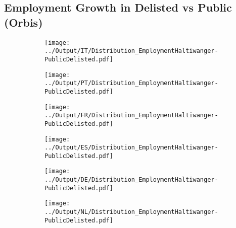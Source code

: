 \documentclass[12pt,notitlepage]{article}
\begin{document}
\subsection{Employment Growth in Delisted vs Public (Orbis)}
\begin{figure}[!htpb]
\centering
\begin{subfigure}{.49\textwidth}
    \centering
 \texttt{[image: ../Output/IT/Distribution\_EmploymentHaltiwanger-PublicDelisted.pdf]}
\end{subfigure}%
\begin{subfigure}{.49\textwidth}
    \centering
 \texttt{[image: ../Output/PT/Distribution\_EmploymentHaltiwanger-PublicDelisted.pdf]}
\end{subfigure}
\begin{subfigure}{.49\textwidth}
    \centering
 \texttt{[image: ../Output/FR/Distribution\_EmploymentHaltiwanger-PublicDelisted.pdf]}
\end{subfigure}%
\begin{subfigure}{.49\textwidth}
    \centering
 \texttt{[image: ../Output/ES/Distribution\_EmploymentHaltiwanger-PublicDelisted.pdf]}
\end{subfigure}
\begin{subfigure}{.49\textwidth}
    \centering
 \texttt{[image: ../Output/DE/Distribution\_EmploymentHaltiwanger-PublicDelisted.pdf]}
\end{subfigure}
\begin{subfigure}{.49\textwidth}
    \centering
 \texttt{[image: ../Output/NL/Distribution\_EmploymentHaltiwanger-PublicDelisted.pdf]}
\end{subfigure}
\end{figure}
\pagebreak

\end{document}
